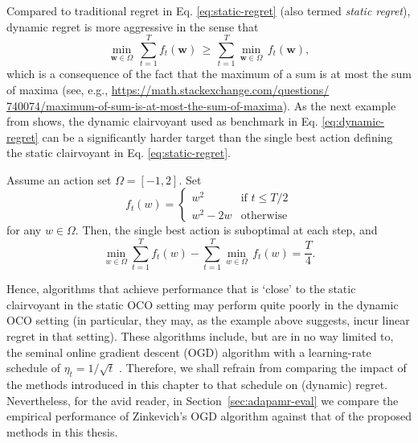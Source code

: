 \begin{mccorrection}
Compared to traditional regret in Eq. \eqref{eq:static-regret} (also termed \emph{static regret}), dynamic regret is more aggressive in the sense that
\begin{equation}
	\min_{\mathbf{w} \in \Omega} \, \sum_{t=1}^T f_t(\mathbf{w})
	\, \geq \, \sum_{t=1}^T \min_{\mathbf{w} \in \Omega} \, f_t(\mathbf{w}),
\end{equation}
which is a consequence of the fact that the maximum of a sum is at most the sum of maxima (see, e.g., \url{https://math.stackexchange.com/questions/
740074/maximum-of-sum-is-at-most-the-sum-of-maxima}).
As the next example from \citep{besbes15} shows, the dynamic clairvoyant used as benchmark in Eq. \eqref{eq:dynamic-regret} can be a significantly harder target than the single best action defining the static clairvoyant in Eq. \eqref{eq:static-regret}.
\begin{example}
Assume an action set $\Omega = [-1, 2]$. %
Set
\begin{equation}
	f_{t}(w) = 
	\begin{cases}
		w^2 & \text{if } t \leq T/2 \\
		w^2 - 2w & \text{otherwise}
	\end{cases}
\end{equation}
for any $w \in \Omega$. Then, the single best action is suboptimal at each step, and
\begin{equation}
	\min_{w\in\Omega} \sum_{t=1}^T f_t(w) - \sum_{t=1}^T \min_{w \in \Omega} \, f_t(w) = \frac{T}{4}.
\end{equation}
\end{example}
Hence, algorithms that achieve performance that is `close' to the static clairvoyant in the static OCO setting may perform quite poorly in the dynamic OCO setting (in particular, they may, as the example above suggests, incur linear regret in that setting). These algorithms include, but are in no way limited to, the seminal online gradient descent (OGD) algorithm with a learning-rate schedule of $\eta_t = 1/\sqrt{t}$ \citep{zinkevich03}. Therefore, we shall refrain from comparing the impact of the methods introduced in this chapter to that schedule on (dynamic) regret. Nevertheless, for the avid reader, in Section~\ref{sec:adapamr-eval} we compare the empirical performance of Zinkevich's OGD algorithm against that of the proposed methods in this thesis.
\end{mccorrection}


